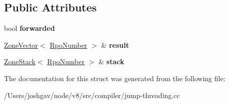 \subsection*{Public Attributes}
\begin{DoxyCompactItemize}
\item 
bool {\bfseries forwarded}\hypertarget{structv8_1_1internal_1_1compiler_1_1_jump_threading_state_a108f201670fec902db12a7e8dbf239fe}{}\label{structv8_1_1internal_1_1compiler_1_1_jump_threading_state_a108f201670fec902db12a7e8dbf239fe}

\item 
\hyperlink{classv8_1_1internal_1_1_zone_vector}{Zone\+Vector}$<$ \hyperlink{classv8_1_1internal_1_1compiler_1_1_rpo_number}{Rpo\+Number} $>$ \& {\bfseries result}\hypertarget{structv8_1_1internal_1_1compiler_1_1_jump_threading_state_a3399bfd0509188b586bc6a57ec15d400}{}\label{structv8_1_1internal_1_1compiler_1_1_jump_threading_state_a3399bfd0509188b586bc6a57ec15d400}

\item 
\hyperlink{classv8_1_1internal_1_1_zone_stack}{Zone\+Stack}$<$ \hyperlink{classv8_1_1internal_1_1compiler_1_1_rpo_number}{Rpo\+Number} $>$ \& {\bfseries stack}\hypertarget{structv8_1_1internal_1_1compiler_1_1_jump_threading_state_a4ff4e8d72a0fc8a0268ad1bf0b02c934}{}\label{structv8_1_1internal_1_1compiler_1_1_jump_threading_state_a4ff4e8d72a0fc8a0268ad1bf0b02c934}

\end{DoxyCompactItemize}


The documentation for this struct was generated from the following file\+:\begin{DoxyCompactItemize}
\item 
/\+Users/joshgav/node/v8/src/compiler/jump-\/threading.\+cc\end{DoxyCompactItemize}
